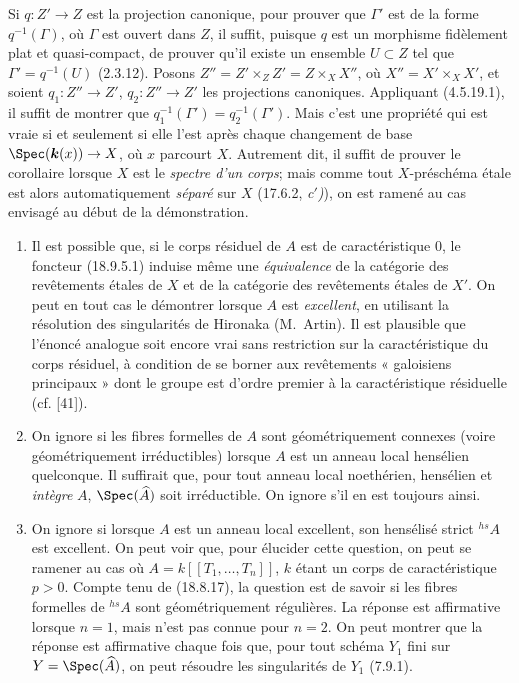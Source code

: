 Si $q:Z'\to Z$ est la projection canonique, pour prouver que $\Gamma'$ est de la forme $q^{-1}(\Gamma)$, où $\Gamma$ est ouvert dans $Z$, il suffit, puisque $q$ est un morphisme fidèlement plat et quasi-compact, de prouver qu'il existe un ensemble $U\subset Z$ tel que $\Gamma'=q^{-1}(U)$ (2.3.12). Posons $Z''=Z'\times_Z Z'=Z\times_X X''$, où $X''=X'\times_X X'$, et soient $q_1:Z''\to Z'$, $q_2:Z''\to Z'$ les projections canoniques. Appliquant (4.5.19.1), il suffit de montrer que $q_1^{-1}(\Gamma')=q_2^{-1}(\Gamma')$. Mais c'est une propriété qui est vraie si et seulement si elle l'est après chaque changement de base $\Spec(\boldsymbol{k}(x))\to X$, où $x$ parcourt $X$. Autrement dit, il suffit de prouver le corollaire lorsque $X$ est le \emph{spectre d'un corps}; mais comme tout $X$-préschéma étale est alors automatiquement \emph{séparé} sur $X$ (17.6.2, \emph{c$'$)}), on est ramené au cas envisagé au début de la démonstration.

\begin{remarks}[18.9.6]
\label{IV.18.9.6}
\begin{enumerate}
  \item[(i)] Il est possible que, si le corps résiduel de $A$ est de caractéristique 0, le foncteur (18.9.5.1) induise même une \emph{équivalence} de la catégorie des revêtements étales de $X$ et de la catégorie des revêtements étales de $X'$. On peut en tout cas le démontrer lorsque $A$ est \emph{excellent}, en utilisant la résolution des singularités de Hironaka (M.~Artin). Il est plausible que l'énoncé analogue soit encore vrai sans restriction sur la caractéristique du corps résiduel, à condition de se borner aux revêtements « galoisiens principaux » dont le groupe est d'ordre premier à la caractéristique résiduelle (cf. [41]).


  \item[(ii)] On ignore si les fibres formelles de $A$ sont géométriquement connexes (voire géométriquement irréductibles) lorsque $A$ est un anneau local hensélien quelconque. Il suffirait que, pour tout anneau local noethérien, hensélien et \emph{intègre} $A$, $\Spec(\widehat A)$ soit irréductible. On ignore s'il en est toujours ainsi.

  \item[(iii)] On ignore si lorsque $A$ est un anneau local excellent, son hensélisé strict ${}^{hs}\!A$ est excellent. On peut voir que, pour élucider cette question, on peut se ramener au cas où $A=k[[T_1,\ldots,T_n]]$, $k$ étant un corps de caractéristique $p>0$. Compte tenu de (18.8.17), la question est de savoir si les fibres formelles de ${}^{hs}\!A$ sont géométriquement régulières. La réponse est affirmative lorsque $n=1$, mais n'est pas connue pour $n=2$. On peut montrer que la réponse est affirmative chaque fois que, pour tout schéma $Y_1$ fini sur $Y=\Spec(\widehat A)$, on peut résoudre les singularités de $Y_1$ (7.9.1).
\end{enumerate}
\end{remarks}


